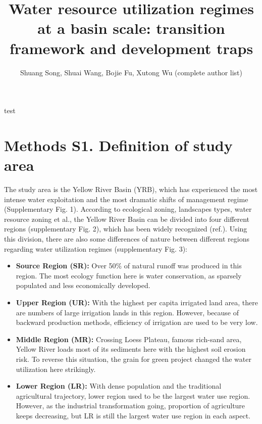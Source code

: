 \documentclass[9pt,twoside,lineno]{pnas-new}
\title{Water resource utilization regimes at a basin scale: transition framework and development traps}
\author{Shuang Song, Shuai Wang, Bojie Fu, Xutong Wu (complete author list)}
\begin{document}

\maketitle

\SItext test



\section*{Methods S1. Definition of study area}
The study area is the Yellow River Basin (YRB), which has experienced the most intense water exploitation and the most dramatic shifts of management regime (Supplementary Fig. 1). According to ecological zoning, landscapes types, water resource zoning et al., the Yellow River Basin can be divided into four different regions (supplementary Fig. 2), which has been widely recognized (ref.). Using this division, there are also some differences of nature between different regions regarding water utilization regimes (supplementary Fig. 3):
\begin{itemize}
    \item \textbf{Source Region (SR):} Over 50\% of natural runoff was produced in this region. The most ecology function here is water conservation, as sparsely populated and less economically developed.
    \item \textbf{Upper Region (UR):} With the highest per capita irrigated land area, there are numbers of large irrigation lands in this region. However, because of backward production methods, efficiency of irrigation are used to be very low.
    \item \textbf{Middle Region (MR):} Crossing Loess Plateau, famous rich-sand area, Yellow River loads most of its sediments here with the highest soil erosion risk. To reverse this situation, the grain for green project changed the water utilization here strikingly.
    \item \textbf{Lower Region (LR):} With dense population and the traditional agricultural trajectory, lower region used to be the largest water use region. However, as the industrial transformation going, proportion of agriculture keeps decreasing, but LR is still the largest water use region in each aspect.
\end{itemize}
\end{document}
